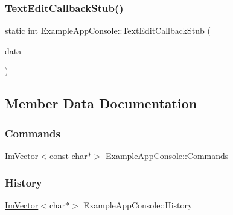 \hypertarget{struct_example_app_console_a722d9b5dc6df127f27c83afeee29bfd3}{}\label{struct_example_app_console_a722d9b5dc6df127f27c83afeee29bfd3} 
\subsubsection{\texorpdfstring{Text\+Edit\+Callback\+Stub()}{TextEditCallbackStub()}}
{\footnotesize\ttfamily static int Example\+App\+Console\+::\+Text\+Edit\+Callback\+Stub (\begin{DoxyParamCaption}\item[{\hyperlink{struct_im_gui_text_edit_callback_data}{Im\+Gui\+Text\+Edit\+Callback\+Data} $\ast$}]{data }\end{DoxyParamCaption})\hspace{0.3cm}{\ttfamily [static]}}



\subsection{Member Data Documentation}
\hypertarget{struct_example_app_console_a1eebee69cceb0345cf9d9b6e6beb9d03}{}\label{struct_example_app_console_a1eebee69cceb0345cf9d9b6e6beb9d03} 
\subsubsection{\texorpdfstring{Commands}{Commands}}
{\footnotesize\ttfamily \hyperlink{class_im_vector}{Im\+Vector}$<$const char$\ast$$>$ Example\+App\+Console\+::\+Commands}

\hypertarget{struct_example_app_console_a11c7fa54e744288f3606e4d6521d6345}{}\label{struct_example_app_console_a11c7fa54e744288f3606e4d6521d6345} 
\subsubsection{\texorpdfstring{History}{History}}
{\footnotesize\ttfamily \hyperlink{class_im_vector}{Im\+Vector}$<$char$\ast$$>$ Example\+App\+Console\+::\+History}

